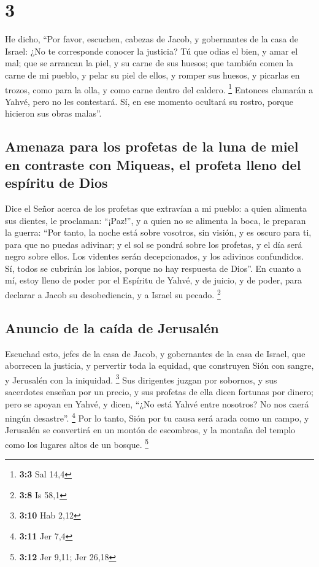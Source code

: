 \hypertarget{section-2}{%
\section{3}\label{section-2}}

 He dicho, ``Por favor, escuchen, cabezas de Jacob, y
gobernantes de la casa de Israel: ¿No te corresponde conocer la
justicia?  Tú que odias el bien, y amar el mal; que se
arrancan la piel, y su carne de sus huesos;  que también
comen la carne de mi pueblo, y pelar su piel de ellos, y romper sus
huesos, y picarlas en trozos, como para la olla, y como carne dentro del
caldero. \footnote{\textbf{3:3} Sal 14,4}  Entonces
clamarán a Yahvé, pero no les contestará. Sí, en ese momento ocultará su
rostro, porque hicieron sus obras malas''.

\hypertarget{amenaza-para-los-profetas-de-la-luna-de-miel-en-contraste-con-miqueas-el-profeta-lleno-del-espuxedritu-de-dios}{%
\subsection{Amenaza para los profetas de la luna de miel en contraste
con Miqueas, el profeta lleno del espíritu de
Dios}\label{amenaza-para-los-profetas-de-la-luna-de-miel-en-contraste-con-miqueas-el-profeta-lleno-del-espuxedritu-de-dios}}

 Dice el Señor acerca de los profetas que extravían a mi
pueblo: a quien alimenta sus dientes, le proclaman: ``¡Paz!'', y a quien
no se alimenta la boca, le preparan la guerra:  ``Por
tanto, la noche está sobre vosotros, sin visión, y es oscuro para ti,
para que no puedas adivinar; y el sol se pondrá sobre los profetas, y el
día será negro sobre ellos.  Los videntes serán
decepcionados, y los adivinos confundidos. Sí, todos se cubrirán los
labios, porque no hay respuesta de Dios''.  En cuanto a
mí, estoy lleno de poder por el Espíritu de Yahvé, y de juicio, y de
poder, para declarar a Jacob su desobediencia, y a Israel su pecado.
\footnote{\textbf{3:8} Is 58,1}

\hypertarget{anuncio-de-la-cauxedda-de-jerusaluxe9n}{%
\subsection{Anuncio de la caída de
Jerusalén}\label{anuncio-de-la-cauxedda-de-jerusaluxe9n}}

 Escuchad esto, jefes de la casa de Jacob, y gobernantes
de la casa de Israel, que aborrecen la justicia, y pervertir toda la
equidad,  que construyen Sión con sangre, y Jerusalén con
la iniquidad. \footnote{\textbf{3:10} Hab 2,12}  Sus
dirigentes juzgan por sobornos, y sus sacerdotes enseñan por un precio,
y sus profetas de ella dicen fortunas por dinero; pero se apoyan en
Yahvé, y dicen, ``¿No está Yahvé entre nosotros? No nos caerá ningún
desastre''. \footnote{\textbf{3:11} Jer 7,4}  Por lo
tanto, Sión por tu causa será arada como un campo, y Jerusalén se
convertirá en un montón de escombros, y la montaña del templo como los
lugares altos de un bosque. \footnote{\textbf{3:12} Jer 9,11; Jer 26,18}

